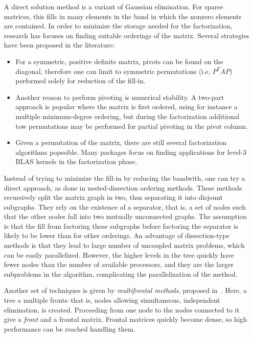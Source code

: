 \documentclass[acmtocl]{acmtrans2m}
\begin{document}
A direct solution method is a variant of Gaussian elimination. For sparse
matrices, this fills in many elements in the band in which the nonzero
elements are contained. In order to minimize the storage needed for the
factorization, research has focuses on finding suitable orderings of the
matrix. Several strategies have been proposed in the literature:
\begin{itemize}
\item For a symmetric, positive definite matrix, pivots can be found on the
diagonal, therefore one can limit to symmetric permutations (i.e, $P^T A P$)
  performed solely for reduction of the fill-in.
\item Another reason to perform pivoting is numerical stability. A two-part
approach is popular where the matrix is first ordered, using for instance a
multiple minimum-degree ordering, but during the factorization additional tow
permutations may be performed for partial pivoting in the pivot column.
\item Given a permutation of the matrix, there are still several factorization
algorithms popssible. Many packages focus on finding applications for level-3
BLAS kernels in the factorization phase.
\end{itemize}
Instead of trying to minimize the fill-in by reducing the bandwith, one can
try a direct approach, as done in nested-dissection ordering methods. These
methods recursively split the matrix graph in two, thus separating it into
disjount subgraphs. They rely on the existence of a separator, that is, a set
of nodes such that the other nodes fall into two mutually unconnected graphs.
The assumption is that the fill from factoring these subgraphs before
factoring the separator is likely to be lower than for other orderings. An
advantage of dissection-type methods is that they lead to large number of
uncoupled matrix problems, which can be easily parallelized. However, the
higher levels in the tree quickly have fewer nodes than the number of
available processors, and they are the larger subproblems  in the algorithm,
  complicating the parallelization of the method.

Another set of techniques is given by {\sl multifrontal methods}, proposed
in~\cite{duff83multifrontal}. Here, a tree a multiple fronts--that is, nodes
allowing simultaneous, independent elimination, is created. Proceeding from
one node to the nodes connected to it give a {\sl front} and a frontal matrix.
Frontal matrices quickly become dense, so high performance can be reached
handling them.
\end{document}
